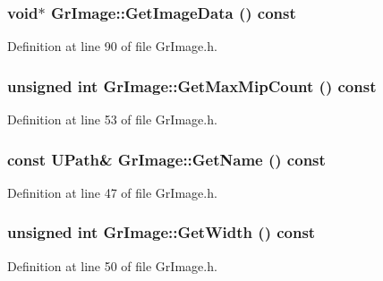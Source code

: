 \begin{CompactItemize}
{\subsubsection[{GetImageData}]{\setlength{\rightskip}{0pt plus 5cm}void$\ast$ GrImage::GetImageData () const}}
\label{class_gr_image_2bdbae66e962b141e9b0509fa5d0baf5}




Definition at line 90 of file GrImage.h.\hypertarget{class_gr_image_4dbab6db5578622e02b89ba5f5ebe5e3}{
\subsubsection[{GetMaxMipCount}]{\setlength{\rightskip}{0pt plus 5cm}unsigned int GrImage::GetMaxMipCount () const}}
\label{class_gr_image_4dbab6db5578622e02b89ba5f5ebe5e3}




Definition at line 53 of file GrImage.h.\hypertarget{class_gr_image_05466580ff5934ea282b1ae32ee69cee}{
\subsubsection[{GetName}]{\setlength{\rightskip}{0pt plus 5cm}const {\bf UPath}\& GrImage::GetName () const}}
\label{class_gr_image_05466580ff5934ea282b1ae32ee69cee}




Definition at line 47 of file GrImage.h.\hypertarget{class_gr_image_800124c1824ea3b75d989e0cab142ca7}{
\subsubsection[{GetWidth}]{\setlength{\rightskip}{0pt plus 5cm}unsigned int GrImage::GetWidth () const}}
\label{class_gr_image_800124c1824ea3b75d989e0cab142ca7}




Definition at line 50 of file GrImage.h.\hypertarget{class_gr_image_af38daff1672308197b7155c1d4fb2e3}{
}
\end{CompactItemize}
